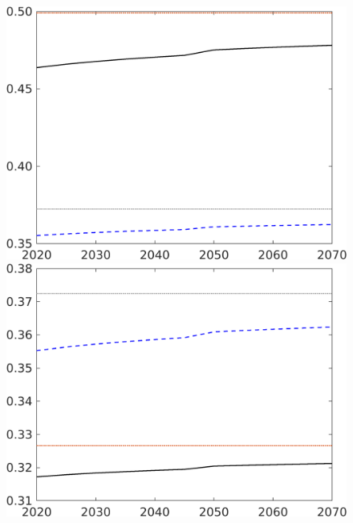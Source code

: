 \begin{figure}[h!!]
\begin{minipage}[]{0.32\textwidth}
		\includegraphics[width=1\textwidth]{../../codding_model/own_basedOnFried/optimalPol_190722_tidiedUp/figures/all_10Aout22/CountNskTaulLF_target_hh_spillover0_sep1_extern0_PV1_etaa0.79_lgd0.png}
	\end{minipage}
	\begin{minipage}[]{0.32\textwidth}
		\includegraphics[width=1\textwidth]{../../codding_model/own_basedOnFried/optimalPol_190722_tidiedUp/figures/all_10Aout22/CountNskTaulLF_target_hl_spillover0_sep1_extern0_PV1_etaa0.79_lgd0.png}
	\end{minipage}
	\begin{minipage}[]{0.32\textwidth}

\end{minipage}
\end{figure}
